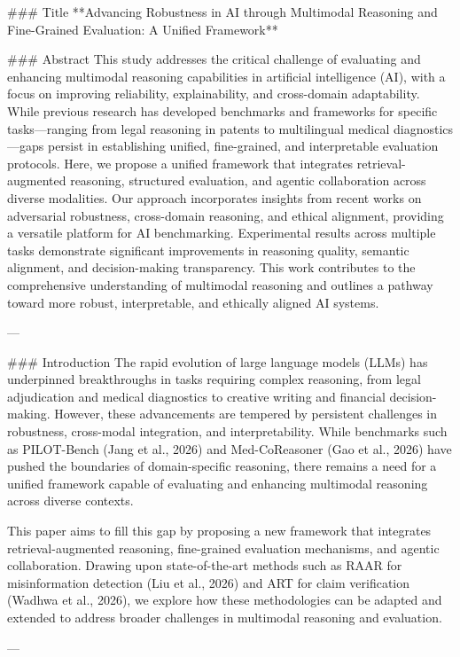 ### Title
**Advancing Robustness in AI through Multimodal Reasoning and Fine-Grained Evaluation: A Unified Framework**

### Abstract
This study addresses the critical challenge of evaluating and enhancing multimodal reasoning capabilities in artificial intelligence (AI), with a focus on improving reliability, explainability, and cross-domain adaptability. While previous research has developed benchmarks and frameworks for specific tasks—ranging from legal reasoning in patents to multilingual medical diagnostics—gaps persist in establishing unified, fine-grained, and interpretable evaluation protocols. Here, we propose a unified framework that integrates retrieval-augmented reasoning, structured evaluation, and agentic collaboration across diverse modalities. Our approach incorporates insights from recent works on adversarial robustness, cross-domain reasoning, and ethical alignment, providing a versatile platform for AI benchmarking. Experimental results across multiple tasks demonstrate significant improvements in reasoning quality, semantic alignment, and decision-making transparency. This work contributes to the comprehensive understanding of multimodal reasoning and outlines a pathway toward more robust, interpretable, and ethically aligned AI systems.

---

### Introduction
The rapid evolution of large language models (LLMs) has underpinned breakthroughs in tasks requiring complex reasoning, from legal adjudication and medical diagnostics to creative writing and financial decision-making. However, these advancements are tempered by persistent challenges in robustness, cross-modal integration, and interpretability. While benchmarks such as PILOT-Bench (Jang et al., 2026) and Med-CoReasoner (Gao et al., 2026) have pushed the boundaries of domain-specific reasoning, there remains a need for a unified framework capable of evaluating and enhancing multimodal reasoning across diverse contexts.

This paper aims to fill this gap by proposing a new framework that integrates retrieval-augmented reasoning, fine-grained evaluation mechanisms, and agentic collaboration. Drawing upon state-of-the-art methods such as RAAR for misinformation detection (Liu et al., 2026) and ART for claim verification (Wadhwa et al., 2026), we explore how these methodologies can be adapted and extended to address broader challenges in multimodal reasoning and evaluation.

---

